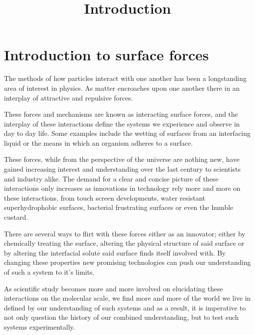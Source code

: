 

\chapter{Introduction to surface forces}






\title{Introduction}

The methods of how particles interact with one another has been a longstanding area of interest in physics. As matter encroaches upon one another there in an interplay of attractive and repulsive forces.

These forces and mechanisms are known as interacting surface forces, and the interplay of these interactions define the systems we experience and observe in day to day life. Some examples include the wetting of surfaces from an interfacing liquid or the means in which an organism adheres to a surface. 

These forces, while from the perspective of the universe are nothing new, have gained increasing interest and understanding over the last century to scientists and industry alike. The demand for a clear and concise picture of these interactions only increases as innovations in technology rely more and more on these interactions, from touch screen developments, water resistant superhydrophobic surfaces, bacterial frustrating surfaces or even the humble custard. 

There are several ways to flirt with these forces either as an innovator; either by chemically treating the surface, altering the physical structure of said surface or by altering the interfacial solute said surface finds itself involved with. By changing these properties new promising technologies can push our understanding of such a system to it's limits. 

As scientific study becomes more and more involved on elucidating these interactions on the molecular scale, we find more and more of the world we live in defined by our understanding of such systems and as a result, it is imperative to not only question the history of our combined understanding, but to test such systems experimentally.

